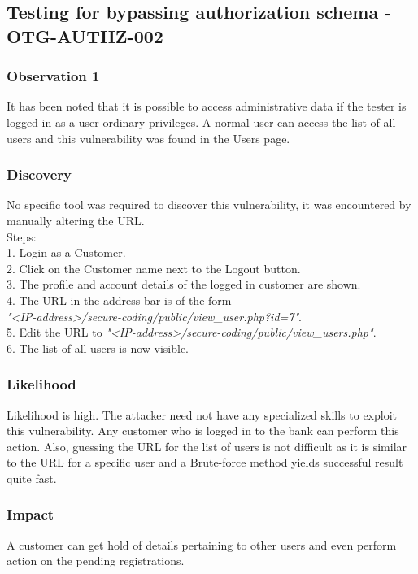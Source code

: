 \subsection{Testing for bypassing authorization schema - OTG-AUTHZ-002} \label{OTG-AUTHZ-002}

\subsubsection{Observation 1}
It has been noted that it is possible to access administrative data if the tester is logged in as a user ordinary privileges. A normal user can access the list of all users and this
vulnerability was found in the Users page.

\subsubsection{Discovery}
No specific tool was required to discover this vulnerability, it was encountered by manually altering the URL.\\
Steps: \\
1. Login as a Customer. \\
2. Click on the Customer name next to the Logout button. \\
3. The profile and account details of the logged in customer are shown. \\
4. The URL in the address bar is of the form \\ \textit{"<IP-address>/secure-coding/public/view\_user.php?id=7"}. \\
5. Edit the URL to \textit{"<IP-address>/secure-coding/public/view\_users.php"}. \\
6. The list of all users is now visible.


\subsubsection{Likelihood}
Likelihood is high.
The attacker need not have any specialized skills to exploit this vulnerability. Any customer who is logged in to the bank can perform this action. Also, guessing the URL for the list of users is not difficult as it is similar to the URL for a specific user and a Brute-force method yields successful result quite fast.

\subsubsection{Impact}
A customer can get hold of details pertaining to other users and even perform action on the pending registrations.

